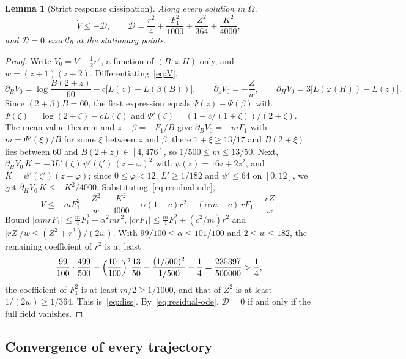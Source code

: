 \documentclass[11pt,a4paper]{article}
\theoremstyle{plain}
\newtheorem{lemma}[theorem]{Lemma}
\theoremstyle{definition}
\theoremstyle{remark}
\newcommand{\D}{\mathcal{D}}
\begin{document}
\begin{lemma}[Strict response dissipation]\label{lem:diss}
Along every solution in $\Omega$,
\begin{equation}\label{eq:diss}
\dot V\le-\D,\qquad \D=\frac{r^2}4+\frac{F_1^2}{1000}+\frac{Z^2}{364}+\frac{K^2}{4000},
\end{equation}
and $\D=0$ exactly at the stationary points.
\end{lemma}
\begin{proof}
Write $V_0=V-\tfrac12r^2$, a function of $(B,z,H)$ only, and $w=(z+1)(z+2)$. Differentiating~\eqref{eq:V},
\[
\partial_BV_0=\log\frac{B(2+z)}{60}-c\bigl[L(z)-L(\beta(B))\bigr],\qquad
\partial_zV_0=-\frac Zw,\qquad
\partial_HV_0=3\bigl[L(\varphi(H))-L(z)\bigr].
\]
Since $(2+\beta)B=60$, the first expression equals $\Psi(z)-\Psi(\beta)$ with $\Psi(\zeta)=\log(2+\zeta)-cL(\zeta)$ and $\Psi'(\zeta)=(1-c/(1+\zeta))/(2+\zeta)$. The mean value theorem and $z-\beta=-F_1/B$ give $\partial_BV_0=-mF_1$ with $m=\Psi'(\xi)/B$ for some $\xi$ between $z$ and $\beta$; there $1+\xi\ge13/17$ and $B(2+\xi)$ lies between $60$ and $B(2+z)\in[4,476]$, so $1/500\le m\le13/50$. Next, $\partial_HV_0\,K=-3L'(\zeta)\,\psi'(\zeta')\,(z-\varphi)^2$ with $\psi(z)=16z+2z^2$, and $K=\psi'(\zeta')(z-\varphi)$; since $0\le\varphi<12$, $L'\ge1/182$ and $\psi'\le64$ on $[0,12]$, we get $\partial_HV_0\,K\le-K^2/4000$. Substituting~\eqref{eq:residual-ode},
\[
\dot V\le-mF_1^2-\frac{Z^2}w-\frac{K^2}{4000}-\alpha(1+c)r^2-(\alpha m+c)\,rF_1-\frac{rZ}w .
\]
Bound $|\alpha mrF_1|\le\tfrac m4F_1^2+\alpha^2mr^2$, $|crF_1|\le\tfrac m4F_1^2+(c^2/m)r^2$ and $|rZ|/w\le(Z^2+r^2)/(2w)$. With $99/100\le\alpha\le101/100$ and $2\le w\le182$, the remaining coefficient of $r^2$ is at least
\[
\frac{99}{100}\cdot\frac{499}{500}-\Bigl(\frac{101}{100}\Bigr)^2\frac{13}{50}-\frac{(1/500)^2}{1/500}-\frac14=\frac{235397}{500000}>\frac14 ,
\]
the coefficient of $F_1^2$ is at least $m/2\ge1/1000$, and that of $Z^2$ is at least $1/(2w)\ge1/364$. This is~\eqref{eq:diss}. By~\eqref{eq:residual-ode}, $\D=0$ if and only if the full field vanishes.
\end{proof}

\subsection{Convergence of every trajectory}
\end{document}
